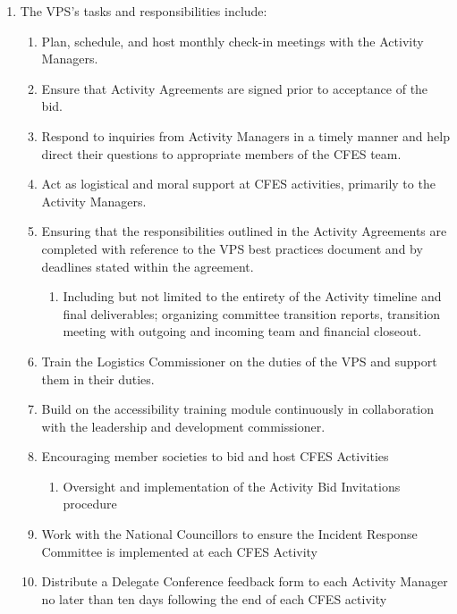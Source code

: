 \begin{enumerate}
 \item
  The VPS's tasks and responsibilities include:

  \begin{enumerate}
   \item
    Plan, schedule, and host monthly check-in meetings with the Activity Managers.
   \item
    Ensure that Activity Agreements are signed prior to acceptance of the bid.
   \item
    Respond to inquiries from Activity Managers in a timely manner and help direct their questions to appropriate members of the CFES team.
   \item
    Act as logistical and moral support at CFES activities, primarily to the Activity Managers.
   \item
    Ensuring that the responsibilities outlined in the Activity Agreements are completed with reference to the VPS best practices document and by deadlines stated within the agreement.
    \begin{enumerate}
     \item
      Including but not limited to the entirety of the Activity timeline and final deliverables; organizing committee transition reports, transition meeting with outgoing and incoming team and financial closeout.
    \end{enumerate}
   \item
    Train the Logistics Commissioner on the duties of the VPS and support them in their duties.
   \item
    Build on the accessibility training module continuously in collaboration with the leadership and development commissioner.
   \item
    Encouraging member societies to bid and host CFES Activities
    \begin{enumerate}
     \item
      Oversight and implementation of the Activity Bid Invitations procedure
    \end{enumerate}
   \item
    Work with the National Councillors to ensure the Incident Response Committee is implemented at each CFES Activity
   \item
    Distribute a Delegate Conference feedback form to each Activity Manager no later than ten days following the end of each CFES activity
  \end{enumerate}
\end{enumerate}

